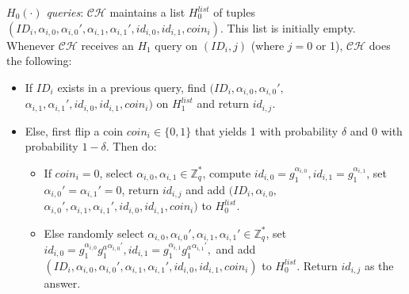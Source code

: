 \documentclass[10pt,journal,compsoc]{IEEEtran}
\begin{document}
\smallskip \noindent $H_0(\cdot)$ \emph{queries}: $\mathcal {CH}$ maintains a list
$H_0^{list}$ of tuples
$(ID_i,\alpha_{i,0},\alpha_{i,0}',\alpha_{i,1},\alpha_{i,1}',id_{i,0},id_{i,1},coin_i).$
This list is initially empty. Whenever $\mathcal {CH}$ receives an
$H_1$ query on $(ID_i,j)$ (where $j=0$ or 1), $\mathcal {CH}$  does
the following:
\begin{itemize}
  \item If $ID_i$ exists in a previous query,
  find
  $(ID_i,\alpha_{i,0},\alpha_{i,0}',$ $\alpha_{i,1},\alpha_{i,1}',id_{i,0},id_{i,1},coin_i)$
  on $H_1^{list}$ and return $id_{i,j}$.
  \item Else, first flip a coin
$coin_i\in \{0,1\}$ that yields 1 with probability $\delta$ and 0
with probability $1-\delta$. Then do:
      \begin{itemize}
        \item If $coin_i=0$, select $\alpha_{i,0},\alpha_{i,1}\in
        \mathbb{Z}_q^*$, compute
        $id_{i,0}=g_1^{\alpha_{i,0}},id_{i,1}=g_1^{\alpha_{i,1}}$, set
        $\alpha_{i,0}'=\alpha_{i,1}'=0$, return $id_{i,j}$
        and add
        $(ID_i,\alpha_{i,0},$ $\alpha_{i,0}',\alpha_{i,1},\alpha_{i,1}',id_{i,0},id_{i,1},coin_i)$
        to $H_0^{list}$.

        \item Else randomly select $\alpha_{i,0},\alpha_{i,0}',\alpha_{i,1},\alpha_{i,1}'\in
        \mathbb{Z}_q^*$,
         set $id_{i,0}=g_1^{\alpha_{i,0}}{g_1^a}^{\alpha_{i,0}'},id_{i,1}=g_1^{\alpha_{i,1}}{g_1^a}^{\alpha_{i,1}'},$
         and add
         $(ID_i,\alpha_{i,0},\alpha_{i,0}',\alpha_{i,1},\alpha_{i,1}',id_{i,0},id_{i,1},coin_i)$
        to $H_0^{list}$. Return $id_{i,j}$ as the answer.
      \end{itemize}
\end{itemize}
\end{document}
